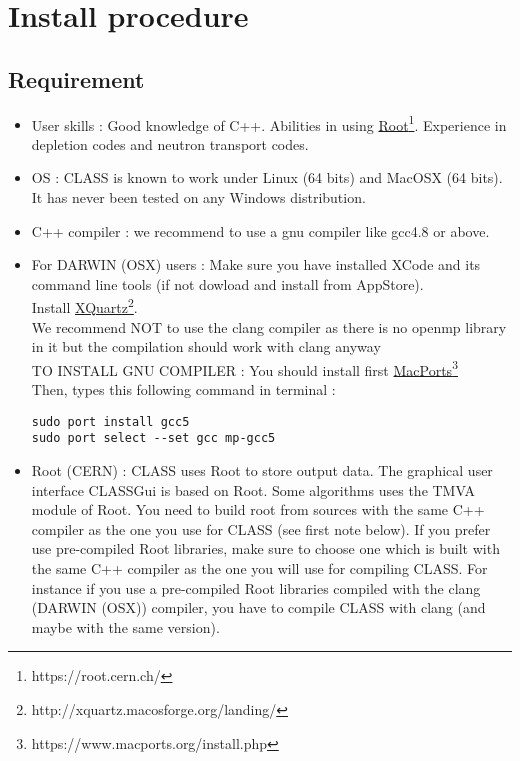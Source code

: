 \chapter{Install procedure}

\section{Requirement}
\begin{center}
\begin{minipage}{\textwidth}
\begin{itemize}
\item User skills : Good knowledge of C++. Abilities in using \href{https://root.cern.ch/}{Root}\footnote{https://root.cern.ch/}.
Experience in depletion codes and neutron transport codes.
\item OS : CLASS is known to work under Linux (64  bits) and MacOSX (64 bits). It  has never been tested on any Windows distribution.
\item C++ compiler :  we recommend to use a gnu compiler like gcc4.8 or above.
\item For DARWIN (OSX) users : 
Make sure you have installed XCode and its command line tools (if not dowload and install from AppStore).\\ 
Install \href{http://xquartz.macosforge.org/landing/}{XQuartz}\footnote{http://xquartz.macosforge.org/landing/}.\\
We recommend NOT to use the clang compiler as there is no openmp library in it but the compilation should work with clang anyway\\
TO INSTALL GNU COMPILER : You should install first \href{https://www.macports.org/install.php}{MacPorts}\footnote{https://www.macports.org/install.php} \\
Then, types this following command in terminal :\\
\begin{lstlisting}[style=terminal]
sudo port install gcc5
sudo port select --set gcc mp-gcc5
\end{lstlisting}
\item Root (CERN) :  
CLASS uses Root to store output data. 
The graphical user interface CLASSGui is based on Root.
Some algorithms uses the TMVA module of Root. You need to build root from sources with the same C++ compiler as the one you use for CLASS (see first note below). If you prefer use pre-compiled Root libraries, make sure to choose one which is built with the same C++ compiler as the one you will use for compiling CLASS.
For instance if you use a pre-compiled Root libraries compiled with the clang (DARWIN (OSX)) compiler, you have to compile CLASS with clang (and maybe with the same version). 

\end{itemize}
\end{minipage}
\end{center}

